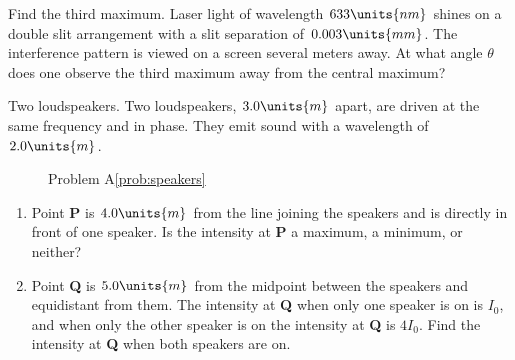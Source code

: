 \begin{aproblem}{Find the third maximum.}
  Laser light of wavelength $633\units{nm}$ shines on a double slit
  arrangement with a slit separation of $0.003\units{mm}$.  The
  interference pattern is viewed on a screen several meters away.  At
  what angle $\theta$ does one observe the third maximum away from the
  central maximum?
\end{aproblem}

\begin{aproblem}{Two loudspeakers.}
  Two loudspeakers, $3.0\units{m}$ apart, are driven at the same
  frequency and in phase.  They emit sound with a wavelength of
  $2.0\units{m}$.
  \label{prob:speakers}
  \begin{figure}[h]
    \begin{center}
      \caption{Problem A\ref{prob:speakers}}
    \end{center}
  \end{figure}
  \begin{enumerate}
  \item Point {\bf P} is $4.0\units{m}$ from the line joining the
    speakers and is directly in front of one speaker.  Is the
    intensity at {\bf P} a maximum, a minimum, or neither?
  \item Point {\bf Q} is $5.0\units{m}$ from the midpoint between the
    speakers and equidistant from them.  The intensity at {\bf Q} when
    only one speaker is on is $I_0$, and when only the other speaker
    is on the intensity at {\bf Q} is $4I_0$.  Find the intensity at
    {\bf Q} when both speakers are on.
  \end{enumerate}
\end{aproblem}


